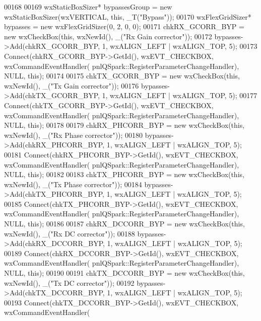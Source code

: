 \begin{DoxyCode}
00168 
00169     wxStaticBoxSizer* bypassesGroup = \textcolor{keyword}{new} wxStaticBoxSizer(wxVERTICAL, \textcolor{keyword}{this}, _T(\textcolor{stringliteral}{"Bypass"}));
00170     wxFlexGridSizer* bypasses = \textcolor{keyword}{new} wxFlexGridSizer(0, 2, 0, 0);
00171     chkRX_GCORR_BYP = \textcolor{keyword}{new} wxCheckBox(\textcolor{keyword}{this}, wxNewId(), \_(\textcolor{stringliteral}{"Rx Gain corrector"}));
00172     bypasses->Add(chkRX_GCORR_BYP, 1, wxALIGN\_LEFT | wxALIGN\_TOP, 5);
00173     Connect(chkRX_GCORR_BYP->GetId(), wxEVT\_CHECKBOX, wxCommandEventHandler(
      pnlQSpark::RegisterParameterChangeHandler), NULL, \textcolor{keyword}{this});
00174 
00175     chkTX_GCORR_BYP = \textcolor{keyword}{new} wxCheckBox(\textcolor{keyword}{this}, wxNewId(), \_(\textcolor{stringliteral}{"Tx Gain corrector"}));
00176     bypasses->Add(chkTX\_GCORR\_BYP, 1, wxALIGN\_LEFT | wxALIGN\_TOP, 5);
00177     Connect(chkTX\_GCORR\_BYP->GetId(), wxEVT\_CHECKBOX, wxCommandEventHandler(
      pnlQSpark::RegisterParameterChangeHandler), NULL, \textcolor{keyword}{this});
00178 
00179     chkRX_PHCORR_BYP = \textcolor{keyword}{new} wxCheckBox(\textcolor{keyword}{this}, wxNewId(), \_(\textcolor{stringliteral}{"Rx Phase corrector"}));
00180     bypasses->Add(chkRX\_PHCORR\_BYP, 1, wxALIGN\_LEFT | wxALIGN\_TOP, 5);
00181     Connect(chkRX\_PHCORR\_BYP->GetId(), wxEVT\_CHECKBOX, wxCommandEventHandler(
      pnlQSpark::RegisterParameterChangeHandler), NULL, \textcolor{keyword}{this});
00182 
00183     chkTX_PHCORR_BYP = \textcolor{keyword}{new} wxCheckBox(\textcolor{keyword}{this}, wxNewId(), \_(\textcolor{stringliteral}{"Tx Phase corrector"}));
00184     bypasses->Add(chkTX\_PHCORR\_BYP, 1, wxALIGN\_LEFT | wxALIGN\_TOP, 5);
00185     Connect(chkTX\_PHCORR\_BYP->GetId(), wxEVT\_CHECKBOX, wxCommandEventHandler(
      pnlQSpark::RegisterParameterChangeHandler), NULL, \textcolor{keyword}{this});
00186 
00187     chkRX_DCCORR_BYP = \textcolor{keyword}{new} wxCheckBox(\textcolor{keyword}{this}, wxNewId(), \_(\textcolor{stringliteral}{"Rx DC corrector"}));
00188     bypasses->Add(chkRX\_DCCORR\_BYP, 1, wxALIGN\_LEFT | wxALIGN\_TOP, 5);
00189     Connect(chkRX\_DCCORR\_BYP->GetId(), wxEVT\_CHECKBOX, wxCommandEventHandler(
      pnlQSpark::RegisterParameterChangeHandler), NULL, \textcolor{keyword}{this});
00190 
00191     chkTX_DCCORR_BYP = \textcolor{keyword}{new} wxCheckBox(\textcolor{keyword}{this}, wxNewId(), \_(\textcolor{stringliteral}{"Tx DC corrector"}));
00192     bypasses->Add(chkTX\_DCCORR\_BYP, 1, wxALIGN\_LEFT | wxALIGN\_TOP, 5);
00193     Connect(chkTX\_DCCORR\_BYP->GetId(), wxEVT\_CHECKBOX, wxCommandEventHandler(

\end{DoxyCode}
